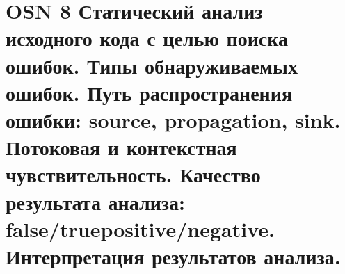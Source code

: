 \section*{OSN 8 Статический анализ исходного кода с целью поиска ошибок. Типы обнаруживаемых ошибок. Путь распространения ошибки: source, propagation, sink. Потоковая и контекстная чувствительность. Качество результата анализа: false/truepositive/negative. Интерпретация результатов анализа.}
